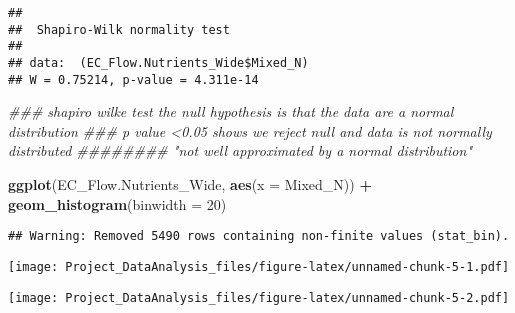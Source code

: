 \documentclass[]{article}
\newenvironment{Shaded}{\begin{snugshade}}{\end{snugshade}}
\newcommand{\CommentTok}[1]{\textcolor[rgb]{0.56,0.35,0.01}{\textit{#1}}}
\newcommand{\DataTypeTok}[1]{\textcolor[rgb]{0.13,0.29,0.53}{#1}}
\newcommand{\DecValTok}[1]{\textcolor[rgb]{0.00,0.00,0.81}{#1}}
\newcommand{\KeywordTok}[1]{\textcolor[rgb]{0.13,0.29,0.53}{\textbf{#1}}}
\newcommand{\NormalTok}[1]{#1}
\newcommand{\OperatorTok}[1]{\textcolor[rgb]{0.81,0.36,0.00}{\textbf{#1}}}
\newcommand{\StringTok}[1]{\textcolor[rgb]{0.31,0.60,0.02}{#1}}
\begin{document}
\begin{verbatim}
## 
##  Shapiro-Wilk normality test
## 
## data:  (EC_Flow.Nutrients_Wide$Mixed_N)
## W = 0.75214, p-value = 4.311e-14
\end{verbatim}

\begin{Shaded}
\begin{Highlighting}[]
\CommentTok{### shapiro wilke test the null hypothesis is that the data are a normal distribution }
\CommentTok{### p value <0.05 shows we reject null and data is not normally distributed}
\CommentTok{######## "not well approximated by a normal distribution"}

\KeywordTok{ggplot}\NormalTok{(EC_Flow.Nutrients_Wide, }\KeywordTok{aes}\NormalTok{(}\DataTypeTok{x =}\NormalTok{ Mixed_N)) }\OperatorTok{+}
\StringTok{  }\KeywordTok{geom_histogram}\NormalTok{(}\DataTypeTok{binwidth =} \DecValTok{20}\NormalTok{) }
\end{Highlighting}
\end{Shaded}

\begin{verbatim}
## Warning: Removed 5490 rows containing non-finite values (stat_bin).
\end{verbatim}

\texttt{[image: Project\_DataAnalysis\_files/figure-latex/unnamed-chunk-5-1.pdf]}

\begin{Shaded}
\end{Shaded}

\texttt{[image: Project\_DataAnalysis\_files/figure-latex/unnamed-chunk-5-2.pdf]}

\begin{Shaded}
\end{Shaded}
\end{document}
